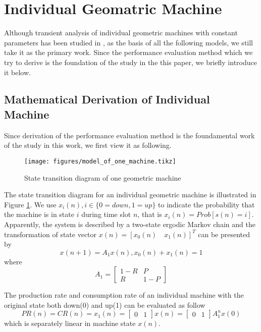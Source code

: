 \section{Individual Geomatric Machine}
\noindent Although transient analysis of individual geometric machines with constant parameters has been studied in \cite{meerkov2010transient}, as the basis of all the following models, we still take it as the primary work. Since the performance evaluation method which we try to derive is the foundation of the study in the this paper, we briefly introduce it below.


\subsection{Mathematical Derivation of Individual Machine}
\noindent Since derivation of the performance evaluation method is the foundamental work of the study in this work, we first view it as following.

\begin{figure}[!h]
	\centering
	\texttt{[image: figures/model\_of\_one\_machine.tikz]}
	\caption{State transition diagram of one geometric machine}
	\label{State transition diagram of one geometric machine}
\end{figure}

The state transition diagram for an individual geometric machine is illustrated in Figure \ref{State transition diagram of one geometric machine}. We use $x_i(n), i \in \{0=down,1=up\}$ to indicate the probability that the machine is in state $i$ during time slot $n$, that is $x_i(n)=Prob[s(n)=i]$. Apparently, the system is described by a two-state ergodic Markov chain and the transformation of state vector $x(n)=[x_0(n) \quad x_1(n)]^T$ can be presented by
\begin{equation}
	x(n+1) = A_1x(n), x_0(n) + x_1(n) =1
\end{equation}
where
\begin{equation} A_1 = 
\begin{bmatrix} 1-R&P\\R&1-P 
\end{bmatrix} 
\end{equation}

The production rate and consumption rate of an individual machine with the original state both down(0) and up(1) can be evaluated as follow
\begin{equation}
 PR(n)=CR(n)=x_1(n)= \begin{bmatrix} 0&1 \end{bmatrix}
x(n)=\begin{bmatrix} 0&1 \end{bmatrix}A_1^n
x(0) 
\end{equation}
which is separately linear in machine state $x(n)$.

